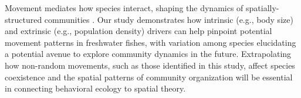 \documentclass[11pt, class=article, crop=false]{standalone}
\begin{document}
Movement mediates how species interact, shaping the dynamics of spatially-structured communities \citep{schlagelMovementmediatedCommunityAssembly2020}. Our study demonstrates how intrinsic (e.g., body size) and extrinsic (e.g., population density) drivers can help pinpoint potential movement patterns in freshwater fishes, with variation among species elucidating a potential avenue to explore community dynamics in the future. Extrapolating how non-random movements, such as those identified in this study, affect species coexistence and the spatial patterns of community organization will be essential in connecting behavioral ecology to spatial theory.








\end{document}
